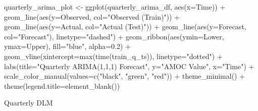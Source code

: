 \documentclass[
  11pt,
]{article}
\newenvironment{Shaded}{\begin{snugshade}}{\end{snugshade}}
\newcommand{\AttributeTok}[1]{\textcolor[rgb]{0.40,0.45,0.13}{#1}}
\newcommand{\FloatTok}[1]{\textcolor[rgb]{0.68,0.00,0.00}{#1}}
\newcommand{\FunctionTok}[1]{\textcolor[rgb]{0.28,0.35,0.67}{#1}}
\newcommand{\NormalTok}[1]{\textcolor[rgb]{0.00,0.23,0.31}{#1}}
\newcommand{\OtherTok}[1]{\textcolor[rgb]{0.00,0.23,0.31}{#1}}
\newcommand{\SpecialCharTok}[1]{\textcolor[rgb]{0.37,0.37,0.37}{#1}}
\newcommand{\StringTok}[1]{\textcolor[rgb]{0.13,0.47,0.30}{#1}}
\begin{document}
\begin{Shaded}
\begin{Highlighting}[]
\NormalTok{quarterly\_arima\_plot }\OtherTok{\textless{}{-}} \FunctionTok{ggplot}\NormalTok{(quarterly\_arima\_df, }\FunctionTok{aes}\NormalTok{(}\AttributeTok{x=}\NormalTok{Time)) }\SpecialCharTok{+}
  \FunctionTok{geom\_line}\NormalTok{(}\FunctionTok{aes}\NormalTok{(}\AttributeTok{y=}\NormalTok{Observed, }\AttributeTok{col=}\StringTok{"Observed (Train)"}\NormalTok{)) }\SpecialCharTok{+}
  \FunctionTok{geom\_line}\NormalTok{(}\FunctionTok{aes}\NormalTok{(}\AttributeTok{y=}\NormalTok{Actual, }\AttributeTok{col=}\StringTok{"Actual (Test)"}\NormalTok{)) }\SpecialCharTok{+}
  \FunctionTok{geom\_line}\NormalTok{(}\FunctionTok{aes}\NormalTok{(}\AttributeTok{y=}\NormalTok{Forecast, }\AttributeTok{col=}\StringTok{"Forecast"}\NormalTok{), }\AttributeTok{linetype=}\StringTok{"dashed"}\NormalTok{) }\SpecialCharTok{+}
  \FunctionTok{geom\_ribbon}\NormalTok{(}\FunctionTok{aes}\NormalTok{(}\AttributeTok{ymin=}\NormalTok{Lower, }\AttributeTok{ymax=}\NormalTok{Upper), }\AttributeTok{fill=}\StringTok{"blue"}\NormalTok{, }\AttributeTok{alpha=}\FloatTok{0.2}\NormalTok{) }\SpecialCharTok{+}
  \FunctionTok{geom\_vline}\NormalTok{(}\AttributeTok{xintercept=}\FunctionTok{max}\NormalTok{(}\FunctionTok{time}\NormalTok{(train\_q\_ts)), }\AttributeTok{linetype=}\StringTok{"dotted"}\NormalTok{) }\SpecialCharTok{+}
  \FunctionTok{labs}\NormalTok{(}\AttributeTok{title=}\StringTok{"Quarterly ARIMA(1,1,1) Forecast"}\NormalTok{, }\AttributeTok{y=}\StringTok{"AMOC Value"}\NormalTok{, }\AttributeTok{x=}\StringTok{"Time"}\NormalTok{) }\SpecialCharTok{+}
  \FunctionTok{scale\_color\_manual}\NormalTok{(}\AttributeTok{values=}\FunctionTok{c}\NormalTok{(}\StringTok{"black"}\NormalTok{, }\StringTok{"green"}\NormalTok{, }\StringTok{"red"}\NormalTok{)) }\SpecialCharTok{+}
  \FunctionTok{theme\_minimal}\NormalTok{() }\SpecialCharTok{+}
  \FunctionTok{theme}\NormalTok{(}\AttributeTok{legend.title=}\FunctionTok{element\_blank}\NormalTok{())}
\end{Highlighting}
\end{Shaded}

Quarterly DLM
\end{document}
